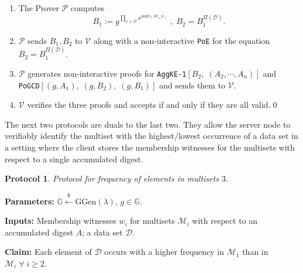 \documentclass[11pt, lettersize, notitlepage, leqno, footskip=0.6cm]{article}
\newcommand{\pl}{\prod\limits}
\newcommand{\mc}{\mathcal}
\newcommand{\mb}{\mathbb}
\newcommand{\mr}{\mathrm}
\newcommand{\lamb}{\lambda}
\newcommand{\mP}{\mc{P}}
\newcommand{\V}{\mc{V}}
\newcommand{\vs}{\vspace{-0.15cm}}
\newcommand{\noin}{\noindent}
\newtheorem{Prot}[Thm]{Protocol}
\numberwithin{equation}{section}
\begin{document}
\begin{enumerate}[wide, labelwidth=!, labelindent=0pt] \vs

\item The Prover $\mP$ computes \vs $$B_1:= g^{\pl_{x\in\mc{D}} x^{\mr{mult(\mc{M}_1, x)}}}\;,\; B_2 = B_1^{\Pi(\mc{D})}.$$ \vspace{-0.8cm}

\item $\mP$ sends $B_1, B_2$ to $\V$ along with a non-interactive \verb|PoE| for the equation $B_2= B_1^{\Pi(\mc{D})}$. \vs

\item $\mP$ generates non-interactive proofs for \verb|AggKE-1|$[B_2,\;(A_2,\cdots,A_n)]$ and\\ \verb|PoGCD|$[(g, A_1),\;(g, B_2),\;(g,B_1)]$ and sends them to $\V$. \vs

\item $\V$ verifies the three proofs and accepts if and only if they are all valid.\qed\end{enumerate}

\noin The next two protocols are duals to the last two. They allow the server node to verifiably identify the multiset with the highest/lowest occurrence of a data set in a setting where the client stores the membership witnesses for the multisets with respect to a single accumulated digest.

\begin{Prot} Protocol for frequency of elements in multisets $3$.\end{Prot} \vspace{-0.3cm}

\noin \textbf{Parameters:} $\mb{G}\xleftarrow{\$} \mr{GGen}(\lamb)$,\; $g\in \mb{G}$.

\noin \textbf{Inputs:} Membership witnesses $w_i$ for multisets $\mc{M}_i$ with respect to an accumulated digest $A$; a data set $\mc{D}$.

\noin \textbf{Claim:} Each element of $\mc{D}$ occurs with a higher frequency in $\mc{M}_1$ than in $\mc{M}_i\;\forall\;i\geq 2$. \vs
\end{document}
